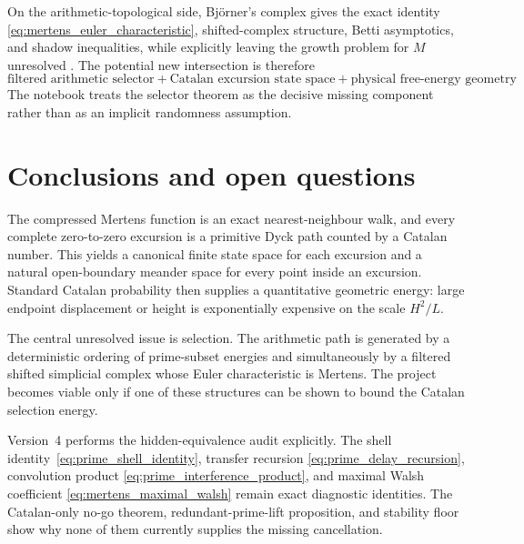 \documentclass[11pt]{amsart}
\numberwithin{equation}{section}
\theoremstyle{plain}
\theoremstyle{definition}
\theoremstyle{remark}
\newcommand{\Mert}{M}
\begin{document}
On the arithmetic-topological side, Bj\"orner's complex gives the exact identity \eqref{eq:mertens_euler_characteristic}, shifted-complex structure, Betti asymptotics, and shadow inequalities, while explicitly leaving the growth problem for $\Mert$ unresolved \cite{Bjorner2011}.  The potential new intersection is therefore
\begin{equation}
\boxed{
\text{filtered arithmetic selector}
+
\text{Catalan excursion state space}
+
\text{physical free-energy geometry}
}.
\label{eq:literature_intersection}
\end{equation}
The notebook treats the selector theorem as the decisive missing component rather than as an implicit randomness assumption.

\section{Conclusions and open questions}
\label{sec:conclusions}

The compressed Mertens function is an exact nearest-neighbour walk, and every complete zero-to-zero excursion is a primitive Dyck path counted by a Catalan number.  This yields a canonical finite state space for each excursion and a natural open-boundary meander space for every point inside an excursion.  Standard Catalan probability then supplies a quantitative geometric energy: large endpoint displacement or height is exponentially expensive on the scale $H^2/L$.

The central unresolved issue is selection.  The arithmetic path is generated by a deterministic ordering of prime-subset energies and simultaneously by a filtered shifted simplicial complex whose Euler characteristic is Mertens.  The project becomes viable only if one of these structures can be shown to bound the Catalan selection energy.

Version~4 performs the hidden-equivalence audit explicitly.  The shell
identity~\eqref{eq:prime_shell_identity}, transfer recursion
\eqref{eq:prime_delay_recursion}, convolution product
\eqref{eq:prime_interference_product}, and maximal Walsh coefficient
\eqref{eq:mertens_maximal_walsh} remain exact diagnostic identities.  The
Catalan-only no-go theorem, redundant-prime-lift proposition, and stability
floor show why none of them currently supplies the missing cancellation.
\end{document}
